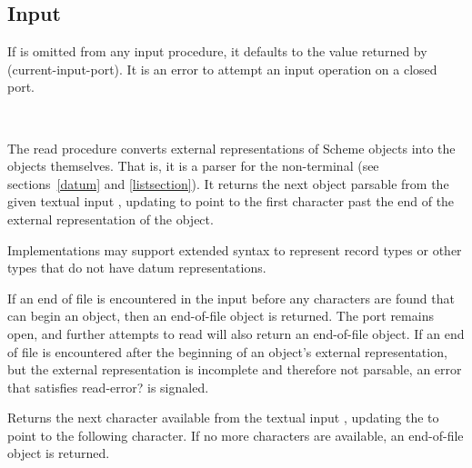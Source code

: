 \subsection{Input}
\label{inputsection}

If  is omitted from any input procedure, it defaults to the
value returned by {\cf (current-input-port)}.
It is an error to attempt an input operation on a closed port.

\noindent \hbox{ }
\vspace{-5ex}


\begin{entry}{
}

The {\cf read} procedure converts external representations of Scheme objects into the
objects themselves.  That is, it is a parser for the non-terminal
 (see sections~\ref{datum} and
\ref{listsection}).  It returns the next
object parsable from the given textual input , updating
 to point to
the first character past the end of the external representation of the object.

Implementations may support extended syntax to represent record types or
other types that do not have datum representations.

\vest If an end of file is encountered in the input before any
characters are found that can begin an object, then an end-of-file
object is returned.  The port remains open, and further attempts
to read will also return an end-of-file object.  If an end of file is
encountered after the beginning of an object's external representation,
but the external representation is incomplete and therefore not parsable,
an error that satisfies {\cf read-error?} is signaled.

\end{entry}

\begin{entry}{
}

Returns the next character available from the textual input ,
updating
the  to point to the following character.  If no more characters
are available, an end-of-file object is returned.

\end{entry}


